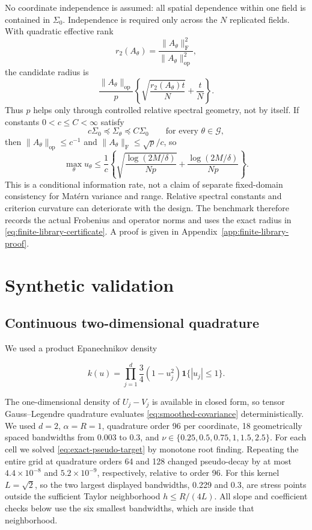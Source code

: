 \documentclass[11pt]{article}
\theoremstyle{remark}
\begin{document}
No coordinate independence is assumed: all spatial dependence within one
field is contained in \(\Sigma_0\).  Independence is required only across the
\(N\) replicated fields.  With quadratic effective rank
\[
  r_2(A_\theta)=
  \frac{\lVert A_\theta\rVert_{\mathrm F}^2}
       {\lVert A_\theta\rVert_{\mathrm{op}}^2},
\]
the candidate radius is
\[
  \frac{\lVert A_\theta\rVert_{\mathrm{op}}}{p}
  \left\{\sqrt{\frac{r_2(A_\theta)t}{N}}+\frac{t}{N}\right\}.
\]
Thus \(p\) helps only through controlled relative spectral geometry, not by
itself.  If constants \(0<c\leq C<\infty\) satisfy
\begin{equation}
  c\Sigma_0\preceq\Sigma_\theta\preceq C\Sigma_0
  \qquad\text{for every }\theta\in\mathcal G,
  \label{eq:relative-spectral-control}
\end{equation}
then \(\lVert A_\theta\rVert_{\mathrm{op}}\leq c^{-1}\) and
\(\lVert A_\theta\rVert_{\mathrm F}\leq\sqrt p/c\), so
\begin{equation}
  \max_\theta u_\theta\leq \frac1c\left\{
  \sqrt{\frac{\log(2M/\delta)}{Np}}
  +\frac{\log(2M/\delta)}{Np}\right\}.
  \label{eq:finite-library-np-rate}
\end{equation}
This is a conditional information rate, not a claim of separate fixed-domain
consistency for Mat\'ern variance and range.  Relative spectral constants and
criterion curvature can deteriorate with the design.  The benchmark therefore
records the actual Frobenius and operator norms and uses the exact radius in
\eqref{eq:finite-library-certificate}.  A proof is given in
Appendix~\ref{app:finite-library-proof}.

\section{Synthetic validation}

\subsection{Continuous two-dimensional quadrature}

We used a product Epanechnikov density

\begin{equation}
  k(u)=\prod_{j=1}^d\frac34(1-u_j^2)\mathbf 1\{|u_j|\leq1\}.
\end{equation}

The one-dimensional density of \(U_j-V_j\) is available in closed form, so
tensor Gauss--Legendre quadrature evaluates \eqref{eq:smoothed-covariance}
deterministically.  We used \(d=2\), \(\alpha=R=1\), quadrature order 96 per
coordinate, 18 geometrically spaced bandwidths from 0.003 to 0.3, and
\(\nu\in\{0.25,0.5,0.75,1,1.5,2.5\}\).  For each cell we solved
\eqref{eq:exact-pseudo-target} by monotone root finding.  Repeating the entire
grid at quadrature orders 64 and 128 changed pseudo-decay by at most
\(4.4\times10^{-8}\) and \(5.2\times10^{-9}\), respectively, relative to
order 96.
For this kernel \(L=\sqrt2\), so the two largest displayed bandwidths, 0.229
and 0.3, are stress points outside the sufficient Taylor neighborhood
\(h\leq R/(4L)\).  All slope and coefficient checks below use the six smallest
bandwidths, which are inside that neighborhood.
\end{document}
